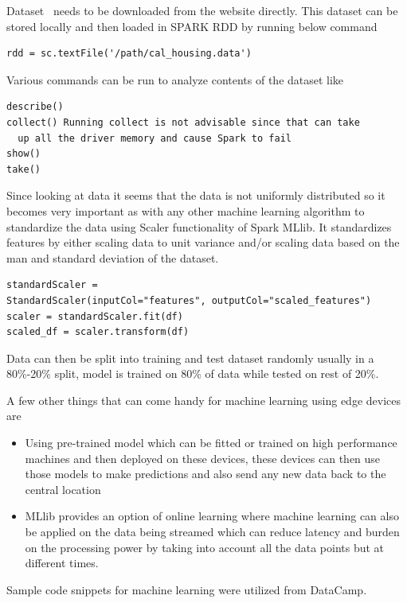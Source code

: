 Dataset~\cite{hid-sp18-510-dataset} needs to be downloaded from the
website directly. This dataset can be stored locally and then loaded
in SPARK RDD by running below command

\begin{verbatim}
rdd = sc.textFile('/path/cal_housing.data')
\end{verbatim} 

Various commands can be run to analyze contents of the dataset like 
\begin{verbatim}
describe()
collect() Running collect is not advisable since that can take
  up all the driver memory and cause Spark to fail
show()
take()
\end{verbatim}

Since looking at data it seems that the data is not uniformly
distributed so it becomes very important as with any other machine
learning algorithm to standardize the data using Scaler functionality
of Spark MLlib. It standardizes features by either scaling data to
unit variance and/or scaling data based on the man and standard
deviation of the dataset.

\begin{verbatim}
standardScaler = 
StandardScaler(inputCol="features", outputCol="scaled_features") 
scaler = standardScaler.fit(df)
scaled_df = scaler.transform(df)
\end{verbatim}

Data can then be split into training and test dataset randomly 
usually in a 80\%-20\% split, model is trained on 80\% of data 
while tested on rest of 20\%. 

A few other things that can come handy for machine learning using 
edge devices are

\begin{itemize}
\item Using pre-trained model which can be fitted or trained on high
  performance machines and then deployed on these devices, these
  devices can then use those models to make predictions and also send
  any new data back to the central location
\item MLlib provides an option of online learning where machine
  learning can also be applied on the data being streamed which can
  reduce latency and burden on the processing power by taking into
  account all the data points but at different times.
\end{itemize}

Sample code snippets for machine learning were utilized from
DataCamp\cite{hid-sp18-510-dc}.

